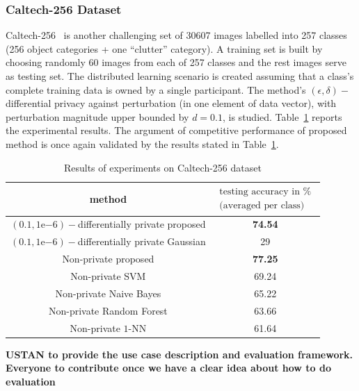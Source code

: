  
\subsubsection{Caltech-256 Dataset}
Caltech-256~\cite{griffinHolubPerona} is another challenging set of 30607 images labelled into 257 classes (256 object categories + one ``clutter'' category). A training set is built by choosing randomly 60 images from each of 257 classes and the rest images serve as testing set. The distributed learning scenario is created assuming that a class's complete training data is owned by a single participant. The method's $(\epsilon,\delta)-$differential privacy against perturbation (in one element of data vector), with perturbation magnitude upper bounded by $d = 0.1$, is studied. Table~\ref{table_results_caltech256}  reports the experimental results. The argument of competitive performance of proposed method is once again validated by the results stated in Table~\ref{table_results_caltech256}. 
\begin{table}
\renewcommand{\arraystretch}{1.3}
\caption{Results of experiments on Caltech-256 dataset}
\label{table_results_caltech256} \centering
\begin{tabular}{c||c}
\hline
\bfseries method  & \bfseries $\begin{array}{c} \mbox{testing accuracy in \%} \\ \mbox{(averaged per class)} \end{array}$   \\
\hline \hline  
$(0.1,1\mathrm{e}{-6})-$differentially private proposed & \textbf{74.54} \\
$(0.1,1\mathrm{e}{-6})-$differentially private Gaussian & 29 \\
Non-private proposed & \textbf{77.25}   \\
Non-private SVM &    69.24      \\
Non-private Naive Bayes &  65.22    \\
Non-private Random Forest &  63.66    \\
Non-private $1$-NN & 61.64    \\
\hline \hline
\end{tabular}
\end{table}    






\textbf{USTAN to provide the use case description and evaluation framework. Everyone to contribute once we have a clear idea about how to do evaluation}

